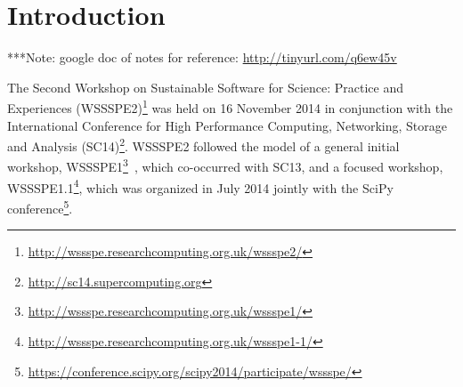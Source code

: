 \documentclass[11pt, oneside]{amsart}
\newcommand{\note}[1]{ {\textcolor{blueish}    { ***Note:      #1 }}}
\newcommand{\katznote}[1]{ {\textcolor{magenta}    { ***Dan:      #1 }}}
\newcommand{\gabnote}[1]{ {\textcolor{cyan}    { ***Gabrielle:     #1 }}}
\newcommand{\nchnote}[1]{  {\textcolor{orange}      { ***Neil: #1 }}}
\newcommand{\manishnote}[1]{  {\textcolor{violet}     { ***Manish: #1 }}}
\newcommand{\davidnote}[1]{  {\textcolor{darkgreen}      { ***David: #1 }}}
\begin{document}
\maketitle


\section{Introduction} \label{sec:intro}

%
%
%
%

\note{google doc of notes for reference: \url{http://tinyurl.com/q6ew45v}}

The Second Workshop on Sustainable Software for Science: Practice and
Experiences
(WSSSPE2)\footnote{\url{http://wssspe.researchcomputing.org.uk/wssspe2/}} was
held on  16 November 2014 in conjunction with the International
Conference for High Performance Computing, Networking, Storage and Analysis
(SC14)\footnote{\url{http://sc14.supercomputing.org}}. WSSSPE2 followed the
model of a general initial workshop,
WSSSPE1\footnote{\url{http://wssspe.researchcomputing.org.uk/wssspe1/}}~\cite{WSSSPE1-pre-report,WSSSPE1},
which co-occurred with SC13, and a focused workshop,
WSSSPE1.1\footnote{\url{http://wssspe.researchcomputing.org.uk/wssspe1-1/}},
which was organized in July 2014 jointly with the SciPy 
conference\footnote{\url{https://conference.scipy.org/scipy2014/participate/wssspe/}}.
\end{document}
